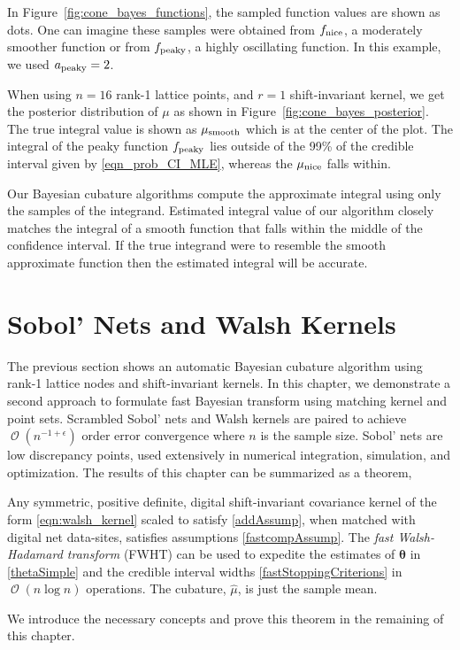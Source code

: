 \documentclass{svjour3}                     %
\DeclareMathOperator{\Order}{{\mathcal O}}
\newcommand{\bm}[1]{\boldsymbol{#1}}
\newcommand{\vtheta}{{\bm{\theta}}}
\newcommand{\vx}{\bm{x}}
\newcommand{\hmu}{\widehat{\mu}}
\newcommand{\NICE}{\textup{nice}}
\newcommand{\PEAKY}{\textup{peaky}}
\newcommand{\TRUE}{\textup{smooth}}
\newcommand\figref{Figure~\ref}
\begin{document}
In \figref{fig:cone_bayes_functions}, the sampled function values
are shown as dots. One can imagine these samples %
were obtained from $f_{\NICE}$, a moderately smoother function or from $f_{\PEAKY}$, a highly oscillating function. In this example, we used $a_{\PEAKY} = 2$.

When using $n=16$ rank-1 lattice points, and $r=1$ shift-invariant kernel, we get the posterior distribution of $\mu$ as shown in \figref{fig:cone_bayes_posterior}. The true integral value is shown as $\mu_{\TRUE}$ which is at the center of the plot. The integral of the peaky function $f_{\PEAKY}$ lies outside of the 99\% of the credible interval given by \eqref{eqn_prob_CI_MLE}, whereas the $\mu_{\NICE}$ falls within.

Our Bayesian cubature algorithms compute the approximate integral using only the samples of the integrand. 
Estimated integral value of our algorithm closely matches the integral of a smooth function that falls within the middle of the confidence interval. If the true integrand were to resemble the smooth approximate function then the estimated integral will be accurate.  

 

\section{Sobol' Nets and Walsh Kernels}
\label{sec:sobol_walsh}



The previous section shows an automatic Bayesian cubature algorithm using rank-1 lattice nodes and shift-invariant kernels. 
In this chapter, we demonstrate a second approach to formulate fast Bayesian transform using matching kernel and point sets. 
Scrambled Sobol' nets and Walsh kernels are paired to achieve $\Order(n^{-1 + \epsilon})$ order error convergence where $n$ is the sample size. 
Sobol' nets \cite{Sob67} are low discrepancy points, used extensively in numerical integration, simulation, and optimization. 
The results of this chapter can be summarized as a theorem,



\begin{theorem}
	Any symmetric, positive definite, digital shift-invariant covariance kernel of the form \eqref{eqn:walsh_kernel} scaled to satisfy \eqref{addAssump}, when matched with digital net data-sites, satisfies assumptions \eqref{fastcompAssump}.  The \emph{fast Walsh-Hadamard transform} (FWHT) can be used to expedite the estimates of $\vtheta$ in \eqref{thetaSimple} and the credible interval widths \eqref{fastStoppingCriterions} in $\Order(n \log n)$ operations. The cubature, $\hmu$, is just the sample mean.
\end{theorem}
We introduce the necessary concepts and prove this theorem in the remaining of this chapter.
\end{document}
